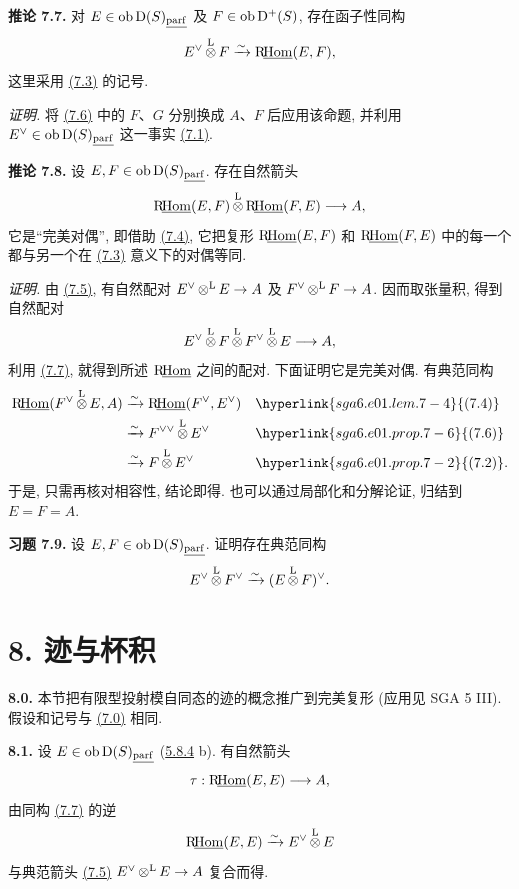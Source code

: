 \textbf{推论 7.7.} 对 \(E\in\operatorname{ob}\mathrm D(S)_{\underline{\mathrm{parf}}}\) 及 \(F\in\operatorname{ob}\mathrm D^+(S)\), 存在函子性同构
\[
  E^\vee\mathop{\otimes}^{\mathrm L} F\xrightarrow{\sim}\mathrm R\!\underline{\operatorname{Hom}}(E,F),
\]
这里采用 \hyperlink{sga6.e01.def.7-3}{(7.3)} 的记号.

\emph{证明.} 将 \hyperlink{sga6.e01.prop.7-6}{(7.6)} 中的 \(F\)、\(G\) 分别换成 \(A\)、\(F\) 后应用该命题, 并利用 \(E^\vee\in\operatorname{ob}\mathrm D(S)_{\underline{\mathrm{parf}}}\) 这一事实 \hyperlink{sga6.e01.prop.7-1}{(7.1)}.

\textbf{推论 7.8.} 设 \(E,F\in\operatorname{ob}\mathrm D(S)_{\underline{\mathrm{parf}}}\). 存在自然箭头
\[
  \mathrm R\!\underline{\operatorname{Hom}}(E,F)\mathop{\otimes}^{\mathrm L} \mathrm R\!\underline{\operatorname{Hom}}(F,E)\longrightarrow A,
\]
它是“完美对偶”, 即借助 \hyperlink{sga6.e01.lem.7-4}{(7.4)}, 它把复形 \(\mathrm R\!\underline{\operatorname{Hom}}(E,F)\) 和 \(\mathrm R\!\underline{\operatorname{Hom}}(F,E)\) 中的每一个都与另一个在 \hyperlink{sga6.e01.def.7-3}{(7.3)} 意义下的对偶等同.

\emph{证明.} 由 \hyperlink{sga6.e01.lem.7-5}{(7.5)}, 有自然配对 \(E^\vee\mathop{\otimes}^{\mathrm L} E\to A\) 及 \(F^\vee\mathop{\otimes}^{\mathrm L} F\to A\). 因而取张量积, 得到自然配对
\[
  E^\vee\mathop{\otimes}^{\mathrm L} F\mathop{\otimes}^{\mathrm L} F^\vee\mathop{\otimes}^{\mathrm L} E\longrightarrow A,
\]
利用 \hyperlink{sga6.e01.cor.7-7}{(7.7)}, 就得到所述 \(\mathrm R\!\underline{\operatorname{Hom}}\) 之间的配对. 下面证明它是完美对偶. 有典范同构
\[
\begin{aligned}
\sgaIRHom(F^\vee\otL E,A)&\xrightarrow{\sim}\sgaIRHom(F^\vee,E^\vee) &&\hyperlink{sga6.e01.lem.7-4}{(7.4)}\\
&\xrightarrow{\sim} F^{\vee\vee}\otL E^\vee &&\hyperlink{sga6.e01.prop.7-6}{(7.6)}\\
&\xrightarrow{\sim} F\otL E^\vee &&\hyperlink{sga6.e01.prop.7-2}{(7.2)}.
\end{aligned}
\]
于是, 只需再核对相容性, 结论即得. 也可以通过局部化和分解论证, 归结到 \(E=F=A\).


\textbf{习题 7.9.} 设 \(E,F\in\operatorname{ob}\mathrm D(S)_{\underline{\mathrm{parf}}}\). 证明存在典范同构
\[
  E^\vee\mathop{\otimes}^{\mathrm L} F^\vee \xrightarrow{\sim} (E\mathop{\otimes}^{\mathrm L} F)^\vee .
\]

\section*{8. 迹与杯积}

\textbf{8.0.} 本节把有限型投射模自同态的迹的概念推广到完美复形 (应用见 SGA 5 III). 假设和记号与 \hyperlink{sga6.e01.para.7-0}{(7.0)} 相同.

\textbf{8.1.} 设 \(E\in\operatorname{ob}\mathrm D(S)_{\underline{\mathrm{parf}}}\) (\hyperlink{sga6.e01.rem.5-8-4}{5.8.4} b). 有自然箭头
\[
  \tau:\mathrm R\!\underline{\operatorname{Hom}}(E,E)\longrightarrow A,
\]
由同构 \hyperlink{sga6.e01.cor.7-7}{(7.7)} 的逆
\[
  \mathrm R\!\underline{\operatorname{Hom}}(E,E)\xrightarrow{\sim}E^\vee\mathop{\otimes}^{\mathrm L} E
\]
与典范箭头 \hyperlink{sga6.e01.lem.7-5}{(7.5)} \(E^\vee\mathop{\otimes}^{\mathrm L} E\to A\) 复合而得.

